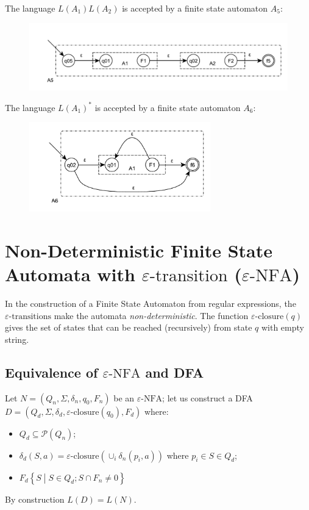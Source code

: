 The language $L(A_1)L(A_2)$ is accepted by a finite state automaton $A_5$:
\begin{figure}[H]
	\centerline{\includegraphics[width=1\textwidth]{img/8.pdf}}
\end{figure}

The language $L(A_1)^\ast$ is accepted by a finite state automaton $A_6$:
\begin{figure}[H]
	\centerline{\includegraphics[width=0.7\textwidth]{img/9.pdf}}
\end{figure}

\section{Non-Deterministic Finite State Automata with $\varepsilon\text{-transition}$ ($\varepsilon\text{-NFA}$)}
In the construction of a Finite State Automaton from regular expressions, the $\varepsilon\text{-transitions}$ make the automata \emph{non-deterministic}.
The function $\varepsilon\text{-closure}(q)$ gives the set of states that can be reached (recursively) from state $q$ with empty string.

\subsection{Equivalence of $\varepsilon\text{-NFA}$ and DFA}
Let $N = (Q_n, \Sigma, \delta_n, q_0, F_n)$ be an $\varepsilon\text{-NFA}$; let us construct a DFA $D = (Q_d, \Sigma, \delta_d, \varepsilon\text{-closure}(q_0), F_d)$ where:
\begin{itemize}
	\item $Q_d \subseteq \mathscr{P}(Q_n)$;
	\item $\delta_d(S, a) = \varepsilon\text{-closure}(\cup_i \delta_n(p_i, a))$ where $p_i \in S \in Q_d$;
	\item $F_d \left\{S \middle| S \in Q_d; S \cap F_n \neq 0\right\}$
\end{itemize}
By construction $L(D) = L(N)$.

